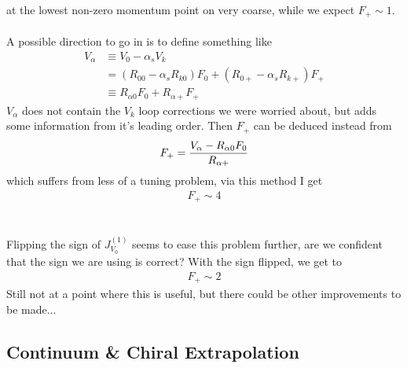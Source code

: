 at the lowest non-zero momentum point on very coarse, while we expect $F_+ \sim 1$.
\\ \\
A possible direction to go in is to define something like
\begin{align}
        \nonumber
        V_{\alpha} &\equiv V_0 - \alpha_s V_k \\
        &= (R_{00} - \alpha_s R_{k0} )F_0 + (R_{0+}-\alpha_s R_{k+})F_+ \\
        \nonumber
        &\equiv R_{\alpha 0} F_0 + R_{\alpha +} F_+
\end{align}
$V_{\alpha}$ does not contain the $V_k$ loop corrections we were worried about, but adds some information from it's leading order. Then $F_+$ can be deduced instead from
\begin{align}
        F_+ = {V_{\alpha} - R_{\alpha 0} F_0 \over R_{\alpha +}}
\end{align}
which suffers from less of a tuning problem, via this method I get
\begin{align}
        F_+ \sim 4
\end{align}
\\ \\
Flipping the sign of $J_{V_0}^{(1)}$ seems to ease this problem further, are we confident that the sign we are using is correct? With the sign flipped, we get to
\begin{align}
        F_+ \sim 2
\end{align}
Still not at a point where this is useful, but there could be other improvements to be made...

\subsection{Continuum \& Chiral Extrapolation}

